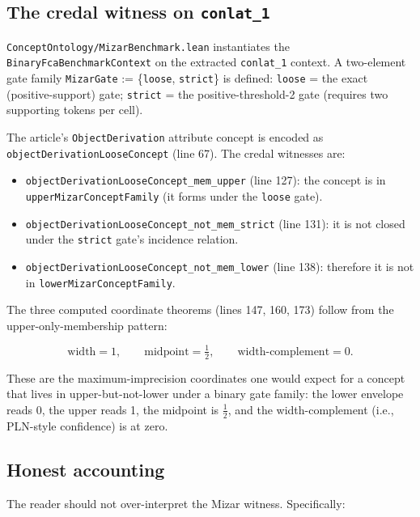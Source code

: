 \documentclass[]{article}
\newcommand{\lid}[1]{{\ttfamily\nolinkurl{#1}}}
\newcommand{\lpath}[1]{\texttt{\nolinkurl{#1}}}
\begin{document}
\subsection{The credal witness on \texorpdfstring{\lid{conlat\_1}}{conlat\_1}}\label{sec:mizar-witness}

\lpath{ConceptOntology/MizarBenchmark.lean} instantiates the
\lid{BinaryFcaBenchmarkContext} on the extracted \lid{conlat\_1} context.
A two-element gate family
\lid{MizarGate} := \{\lid{loose}, \lid{strict}\} is defined:
\lid{loose} = the exact (positive-support) gate; \lid{strict} = the
positive-threshold-2 gate (requires two supporting tokens per cell).

The article's \lid{ObjectDerivation} attribute concept is encoded as
\lid{objectDerivationLooseConcept} (line 67). The credal witnesses are:

\begin{itemize}
\item \lid{objectDerivationLooseConcept\_mem\_upper} (line 127): the concept is
in \lid{upperMizarConceptFamily} (it forms under the \lid{loose} gate).
\item \lid{objectDerivationLooseConcept\_not\_mem\_strict} (line 131): it is not
closed under the \lid{strict} gate's incidence relation.
\item \lid{objectDerivationLooseConcept\_not\_mem\_lower} (line 138): therefore it
is not in \lid{lowerMizarConceptFamily}.
\end{itemize}

\noindent The three computed coordinate theorems (lines 147, 160, 173) follow from
the upper-only-membership pattern:

\[
  \mathrm{width} = 1, \qquad
  \mathrm{midpoint} = \tfrac{1}{2}, \qquad
  \mathrm{width\text{-}complement} = 0.
\]

\noindent These are the maximum-imprecision coordinates one would expect for a
concept that lives in upper-but-not-lower under a binary gate family: the lower
envelope reads 0, the upper reads 1, the midpoint is $\tfrac{1}{2}$, and the
width-complement (i.e., PLN-style confidence) is at zero.

\subsection{Honest accounting}\label{sec:mizar-honest}

The reader should not over-interpret the Mizar witness. Specifically:
\end{document}
